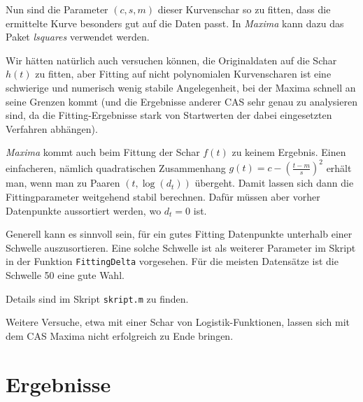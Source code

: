 \documentclass[a4paper,11pt]{article}
\newcommand{\br}[1]{\left(#1\right)}
\begin{document}
Nun sind die Parameter $(c,s,m)$ dieser Kurvenschar so zu fitten, dass die
ermittelte Kurve besonders gut auf die Daten passt.  In \emph{Maxima} kann
dazu das Paket \emph{lsquares} verwendet werden.  

Wir hätten natürlich auch versuchen können, die Originaldaten auf die Schar
$h(t)$ zu fitten, aber Fitting auf nicht polynomialen Kurvenscharen ist eine
schwierige und numerisch wenig stabile Angelegenheit, bei der Maxima schnell
an seine Grenzen kommt (und die Ergebnisse anderer CAS sehr genau zu
analysieren sind, da die Fitting-Ergebnisse stark von Startwerten der dabei
eingesetzten Verfahren abhängen).

\emph{Maxima} kommt auch beim Fittung der Schar $f(t)$ zu keinem Ergebnis.
Einen einfacheren, nämlich quadratischen Zusammenhang
$g(t)=c-\br{\frac{t-m}{s}}^2$ erhält man, wenn man zu Paaren $(t,\log(d_t))$
übergeht.  Damit lassen sich dann die Fittingparameter weitgehend stabil
berechnen. Dafür müssen aber vorher Datenpunkte aussortiert werden, wo $d_t=0$
ist.

Generell kann es sinnvoll sein, für ein gutes Fitting Datenpunkte unterhalb
einer Schwelle auszusortieren. Eine solche Schwelle ist als weiterer Parameter
im Skript in der Funktion \texttt{FittingDelta} vorgesehen. Für die meisten
Datensätze ist die Schwelle 50 eine gute Wahl.

Details sind im Skript \texttt{skript.m} zu finden.

Weitere Versuche, etwa mit einer Schar von Logistik-Funktionen, lassen sich
mit dem CAS Maxima nicht erfolgreich zu Ende bringen. 

\section{Ergebnisse}
\end{document}

